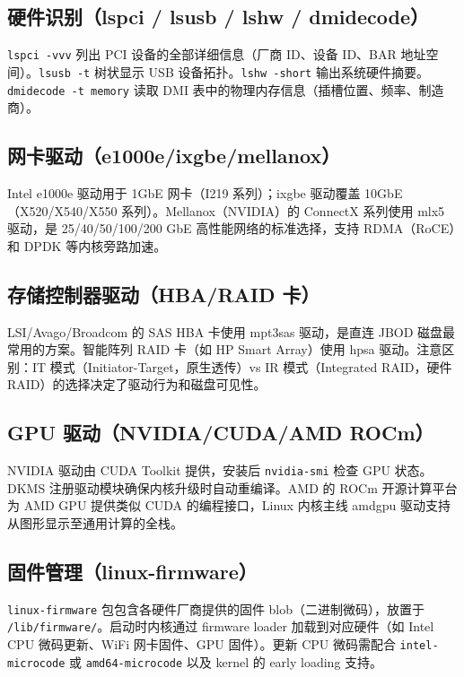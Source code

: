 \documentclass[12pt,UTF8]{ctexbook}
\begin{document}
    \subsection{硬件识别（lspci / lsusb / lshw / dmidecode）}

\verb|lspci -vvv| 列出 PCI 设备的全部详细信息（厂商 ID、设备 ID、BAR 地址空间）。\verb|lsusb -t| 树状显示 USB 设备拓扑。\verb|lshw -short| 输出系统硬件摘要。\verb|dmidecode -t memory| 读取 DMI 表中的物理内存信息（插槽位置、频率、制造商）。

    \subsection{网卡驱动（e1000e/ixgbe/mellanox）}

Intel e1000e 驱动用于 1GbE 网卡（I219 系列）；ixgbe 驱动覆盖 10GbE（X520/X540/X550 系列）。Mellanox（NVIDIA）的 ConnectX 系列使用 mlx5 驱动，是 25/40/50/100/200 GbE 高性能网络的标准选择，支持 RDMA（RoCE）和 DPDK 等内核旁路加速。

    \subsection{存储控制器驱动（HBA/RAID 卡）}

LSI/Avago/Broadcom 的 SAS HBA 卡使用 mpt3sas 驱动，是直连 JBOD 磁盘最常用的方案。智能阵列 RAID 卡（如 HP Smart Array）使用 hpsa 驱动。注意区别：IT 模式（Initiator-Target，原生透传）vs IR 模式（Integrated RAID，硬件 RAID）的选择决定了驱动行为和磁盘可见性。

    \subsection{GPU 驱动（NVIDIA/CUDA/AMD ROCm）}

NVIDIA 驱动由 CUDA Toolkit 提供，安装后 \verb|nvidia-smi| 检查 GPU 状态。DKMS 注册驱动模块确保内核升级时自动重编译。AMD 的 ROCm 开源计算平台为 AMD GPU 提供类似 CUDA 的编程接口，Linux 内核主线 amdgpu 驱动支持从图形显示至通用计算的全栈。

    \subsection{固件管理（linux-firmware）}

\verb|linux-firmware| 包包含各硬件厂商提供的固件 blob（二进制微码），放置于 \verb|/lib/firmware/|。启动时内核通过 firmware loader 加载到对应硬件（如 Intel CPU 微码更新、WiFi 网卡固件、GPU 固件）。更新 CPU 微码需配合 \verb|intel-microcode| 或 \verb|amd64-microcode| 以及 kernel 的 early loading 支持。
\end{document}
